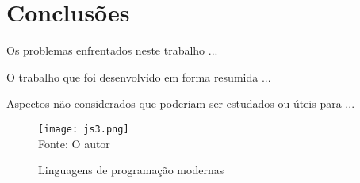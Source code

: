 

\chapter{Conclus\~{o}es}


Os problemas enfrentados neste trabalho ...


O trabalho que foi desenvolvido em forma resumida ...

Aspectos n\~{a}o considerados que poderiam ser estudados ou \'{u}teis para ...



   \begin{figure}[H]
    \begin{center}
        \caption{Linguagens de programa\c{c}\~{a}o modernas} \label{ling2}
        \texttt{[image: js3.png]} \\
        {\tiny \sf Fonte: O autor }
    \end{center}
   \end{figure} 